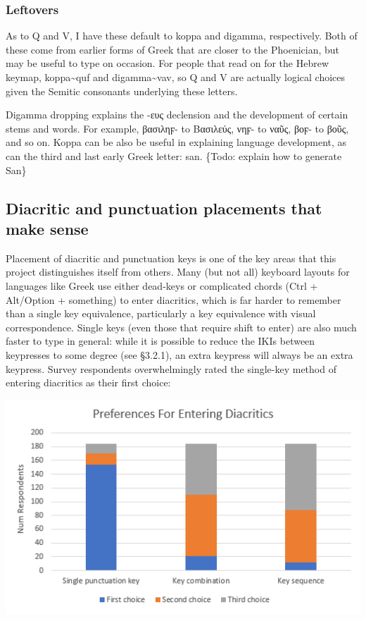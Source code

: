 \documentclass[11pt]{article}
\begin{document}
\subsubsection{Leftovers}
\label{sec:org7bd753b}

As to Q and V, I have these default to koppa and digamma, respectively. Both of these come from earlier forms of Greek that are closer to the Phoenician, but may be useful to type on occasion. For people that read on for the Hebrew keymap, koppa\textasciitilde{}quf and digamma\textasciitilde{}vav, so Q and V are actually logical choices given the Semitic consonants underlying these letters.

Digamma dropping explains the -ευς declension and the development of certain stems and words. For example, βασιληϝ- to Βασιλεύς, νηϝ- to ναῦς, βοϝ- to βοῦς, and so on. Koppa can be also be useful in explaining language development, as can the third and last early Greek letter: san. \{Todo: explain how to generate San\}

\subsection{Diacritic and punctuation placements that make sense}
\label{sec:orga000077}

Placement of diacritic and punctuation keys is one of the key areas that this project distinguishes itself from others. Many (but not all) keyboard layouts for languages like Greek use either dead-keys or complicated chords (Ctrl + Alt/Option + something) to enter diacritics, which is far harder to remember than a single key equivalence, particularly a key equivalence with visual correspondence. Single keys (even those that require shift to enter) are also much faster to type in general: while it is possible to reduce the IKIs between keypresses to some degree (see §3.2.1), an extra keypress will always be an extra keypress. Survey respondents overwhelmingly rated the single-key method of entering diacritics as their first choice:

\begin{center}
\includegraphics[width=.9\linewidth]{./images/diacritic-entry-preferences.PNG}
\end{center}
\end{document}
